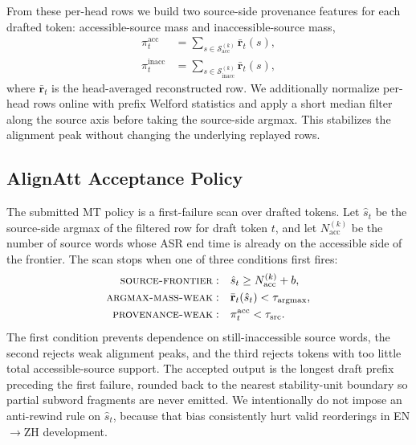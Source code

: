 \documentclass[11pt]{article}
\begin{document}


From these per-head rows we build two source-side provenance features for each
drafted token: accessible-source mass and inaccessible-source mass,
\begin{align}
  \pi_t^{\mathrm{acc}}
  &=
  \sum_{s \in \mathcal{S}^{(k)}_{\mathrm{acc}}} \bar{\mathbf{r}}_t(s),
  \label{eq:mt-prov-acc}\\
  \pi_t^{\mathrm{inacc}}
  &=
  \sum_{s \in \mathcal{S}^{(k)}_{\mathrm{inacc}}} \bar{\mathbf{r}}_t(s),
  \label{eq:mt-provenance}
\end{align}
where $\bar{\mathbf{r}}_t$ is the head-averaged reconstructed row. We
additionally normalize per-head rows online with prefix Welford statistics and
apply a short median filter along the source axis before taking the source-side
argmax. This stabilizes the alignment peak without changing the underlying
replayed rows.

\subsection{AlignAtt Acceptance Policy}

The submitted MT policy is a first-failure scan over drafted tokens. Let
$\hat{s}_t$ be the source-side argmax of the filtered row for draft token $t$,
and let $N^{(k)}_{\mathrm{acc}}$ be the number of source words whose ASR end
time is already on the accessible side of the frontier. The scan stops when one
of three conditions first fires:
\begin{align}
  \text{\textsc{source-frontier}} :\quad
  &\hat{s}_t \ge N^{(k)}_{\mathrm{acc}} + b,
  \label{eq:mt-stop-frontier}\\
  \text{\textsc{argmax-mass-weak}} :\quad
  &\bar{\mathbf{r}}_t(\hat{s}_t) < \tau_{\mathrm{argmax}},
  \label{eq:mt-stop-argmax}\\
  \text{\textsc{provenance-weak}} :\quad
  &\pi_t^{\mathrm{acc}} < \tau_{\mathrm{src}}.
  \label{eq:mt-stop-prov}
\end{align}
The first condition prevents dependence on still-inaccessible source words, the
second rejects weak alignment peaks, and the third rejects tokens with too
little total accessible-source support. The accepted output is the longest
draft prefix preceding the first failure, rounded back to the nearest
stability-unit boundary so partial subword fragments are never emitted. We
intentionally do not impose an anti-rewind rule on $\hat{s}_t$, because that
bias consistently hurt valid reorderings in EN$\to$ZH development.
\end{document}
